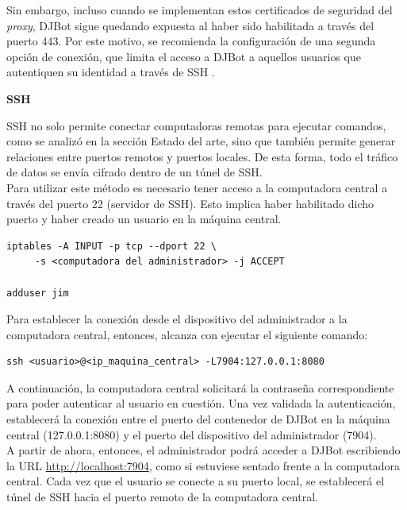 \documentclass[a4paper,12pt]{article}
\begin{document}
Sin embargo, incluso cuando se implementan estos certificados de seguridad del \emph{proxy}, DJBot sigue quedando expuesta al haber sido habilitada a través del puerto 443. Por este motivo, se recomienda la configuración de una segunda opción de conexión, que limita el acceso a DJBot a aquellos usuarios que autentiquen su identidad a través de SSH .\\


\item\textbf{SSH}
\label{sec:orgheadline23}

SSH no solo permite conectar computadoras remotas para ejecutar comandos, como se analizó en la sección Estado del arte, sino que también permite generar relaciones entre puertos remotos y puertos locales. De esta forma, todo el tráfico de datos se envía cifrado dentro de un túnel de SSH.\\

Para utilizar este método es necesario tener acceso a la computadora central a través del puerto 22 (servidor de SSH). Esto implica haber habilitado dicho puerto y haber creado un usuario en la máquina central.

\begin{verbatim}
iptables -A INPUT -p tcp --dport 22 \
	 -s <computadora del administrador> -j ACCEPT

adduser jim
\end{verbatim}

Para establecer la conexión desde el dispositivo del administrador a la computadora central, entonces, alcanza con ejecutar el siguiente comando:\\

\begin{verbatim}
ssh <usuario>@<ip_maquina_central> -L7904:127.0.0.1:8080
\end{verbatim}

A continuación, la computadora central solicitará la contraseña correspondiente para poder autenticar al usuario en cuestión. Una vez validada la autenticación, establecerá la conexión entre el puerto del contenedor de DJBot en la máquina central (127.0.0.1:8080) y el puerto del dispositivo del administrador (7904).\\

A partir de ahora, entonces, el administrador podrá acceder a DJBot escribiendo la URL \url{http://localhost:7904}, como si estuviese sentado frente a la computadora central. Cada vez que el usuario se conecte a su puerto local, se establecerá el túnel de SSH hacia el puerto remoto de la computadora central.\\
\end{document}
